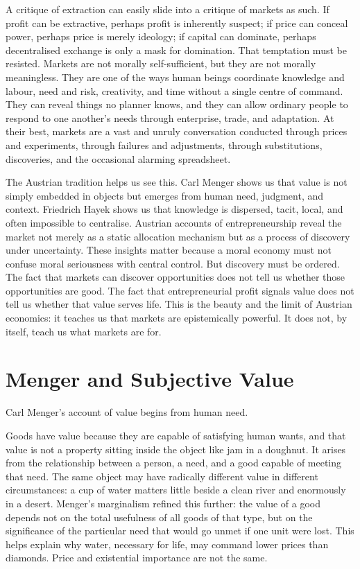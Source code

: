 \documentclass[11pt,a4paper,oneside]{book}
\begin{document}
A critique of extraction can easily slide into a critique of markets as such. If profit can be extractive, perhaps profit is inherently suspect; if price can conceal power, perhaps price is merely ideology; if capital can dominate, perhaps decentralised exchange is only a mask for domination. That temptation must be resisted. Markets are not morally self-sufficient, but they are not morally meaningless. They are one of the ways human beings coordinate knowledge and labour, need and risk, creativity, and time without a single centre of command. They can reveal things no planner knows, and they can allow ordinary people to respond to one another's needs through enterprise, trade, and adaptation. At their best, markets are a vast and unruly conversation conducted through prices and experiments, through failures and adjustments, through substitutions, discoveries, and the occasional alarming spreadsheet.

The Austrian tradition helps us see this. Carl Menger shows us that value is not simply embedded in objects but emerges from human need, judgment, and context. Friedrich Hayek shows us that knowledge is dispersed, tacit, local, and often impossible to centralise. Austrian accounts of entrepreneurship reveal the market not merely as a static allocation mechanism but as a process of discovery under uncertainty. These insights matter because a moral economy must not confuse moral seriousness with central control. But discovery must be ordered. The fact that markets can discover opportunities does not tell us whether those opportunities are good. The fact that entrepreneurial profit signals value does not tell us whether that value serves life. This is the beauty and the limit of Austrian economics: it teaches us that markets are epistemically powerful. It does not, by itself, teach us what markets are for.

\section*{Menger and Subjective Value}

Carl Menger's account of value begins from human need.

Goods have value because they are capable of satisfying human wants, and that value is not a property sitting inside the object like jam in a doughnut. It arises from the relationship between a person, a need, and a good capable of meeting that need. The same object may have radically different value in different circumstances: a cup of water matters little beside a clean river and enormously in a desert. Menger's marginalism refined this further: the value of a good depends not on the total usefulness of all goods of that type, but on the significance of the particular need that would go unmet if one unit were lost. This helps explain why water, necessary for life, may command lower prices than diamonds. Price and existential importance are not the same.
\end{document}
